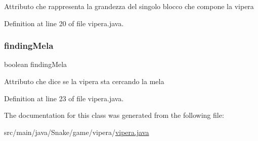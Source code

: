 Attributo che rappresenta la grandezza del singolo blocco che compone la vipera 

Definition at line 20 of file vipera.\+java.

\mbox{\label{class_snake_1_1game_1_1vipera_1_1vipera_a6ce986fc0d66eb097e1caeaf211a0f9e}} 
\subsubsection{\texorpdfstring{finding\+Mela}{findingMela}}
{\footnotesize\ttfamily boolean finding\+Mela\hspace{0.3cm}{\ttfamily [private]}}

Attributo che dice se la vipera sta cercando la mela 

Definition at line 23 of file vipera.\+java.



The documentation for this class was generated from the following file\+:\begin{DoxyCompactItemize}
\item 
src/main/java/\+Snake/game/vipera/\mbox{\hyperlink{vipera_8java}{vipera.\+java}}\end{DoxyCompactItemize}
